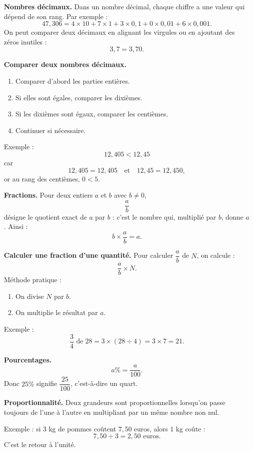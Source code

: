 \documentclass[11pt,a4paper]{article}
\begin{document}
\begin{retenirbox}
\textbf{Nombres décimaux.}
Dans un nombre décimal, chaque chiffre a une valeur qui dépend de son rang.
Par exemple :
\[
47,306 = 4\times 10 + 7\times 1 + 3\times 0,1 + 0\times 0,01 + 6\times 0,001.
\]
On peut comparer deux décimaux en alignant les virgules ou en ajoutant des zéros inutiles :
\[
3,7 = 3,70.
\]
\end{retenirbox}

\begin{methodebox}
\textbf{Comparer deux nombres décimaux.}
\begin{enumerate}[label=\arabic*)]
\item Comparer d'abord les parties entières.
\item Si elles sont égales, comparer les dixièmes.
\item Si les dixièmes sont égaux, comparer les centièmes.
\item Continuer si nécessaire.
\end{enumerate}
Exemple :
\[
12,405 < 12,45
\]
car
\[
12,405 = 12,405 \quad \text{et} \quad 12,45=12,450,
\]
or au rang des centièmes, $0<5$.
\end{methodebox}

\begin{retenirbox}
\textbf{Fractions.}
Pour deux entiers $a$ et $b$ avec $b\neq 0$,
\[
\frac{a}{b}
\]
désigne le quotient exact de $a$ par $b$ : c'est le nombre qui, multiplié par $b$, donne $a$.
Ainsi :
\[
b\times \frac{a}{b}=a.
\]
\end{retenirbox}

\begin{methodebox}
\textbf{Calculer une fraction d'une quantité.}
Pour calculer $\dfrac{a}{b}$ de $N$, on calcule :
\[
\dfrac{a}{b}\times N.
\]
Méthode pratique :
\begin{enumerate}[label=\arabic*)]
\item On divise $N$ par $b$.
\item On multiplie le résultat par $a$.
\end{enumerate}
Exemple :
\[
\frac{3}{4}\text{ de } 28 = 3\times (28\div 4)=3\times 7=21.
\]
\end{methodebox}

\begin{retenirbox}
\textbf{Pourcentages.}
\[
a\% = \frac{a}{100}.
\]
Donc $25\%$ signifie $\dfrac{25}{100}$, c'est-à-dire un quart.
\end{retenirbox}

\begin{methodebox}
\textbf{Proportionnalité.}
Deux grandeurs sont proportionnelles lorsqu'on passe toujours de l'une à l'autre en multipliant par un même nombre non nul.

Exemple : si $3$ kg de pommes coûtent $7,50$ euros, alors $1$ kg coûte :
\[
7,50\div 3 = 2,50 \text{ euros}.
\]
C'est le retour à l'unité.
\end{methodebox}
\end{document}
